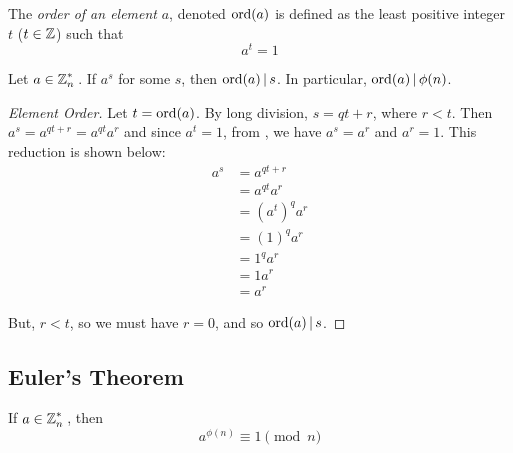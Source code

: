 \begin{definition}\label{def:Element_Order}
  The \emph{order of an element} $a$, denoted $\operatorname{\text{ord}}(a)$ is defined as the least positive integer $t$ ($t \in \operatorname{\mathbb{Z}}$) such that
  \begin{equation}\label{eq:Element_Order}
    a^{t} = 1
  \end{equation}
\end{definition}

\begin{lemma}\label{lemma:Element_Order}
  Let $a \in \operatorname{\mathbb{Z}}_{n}^{*}{}$.
  If $a^{s}$ for some $s$, then $\operatorname{\text{ord}}(a) \operatorname{\vert} s$.
  In particular, $\operatorname{\text{ord}}(a) \operatorname{\vert} \phi(n)$.
\end{lemma}

\begin{proof}[Element Order]\label{proof:Element_Order}
  Let $t = \operatorname{\text{ord}}(a)$.
  By long division, $s = qt + r$, where $r < t$.
  Then $a^{s} = a^{qt + r} = a^{qt}a^{r}$ and since $a^{t} = 1$, from , we have $a^{s} = a^{r}$ and $a^{r} = 1$.
  This reduction is shown below:
  \begin{align*}
    a^{s} &= a^{qt + r} \\
          &= a^{qt}a^{r} \\
          &= {\left( a^{t} \right)}^{q} a^{r} \\
          &= {\left( 1 \right)}^{q} a^{r} \\
          &= 1^{q} a^{r} \\
          &= 1 a^{r} \\
          &= a^{r}
  \end{align*}

  But, $r<t$, so we must have $r=0$, and so $\operatorname{\text{ord}}(a) \operatorname{\vert} s$.
\end{proof}

\subsection{Euler's Theorem}\label{subsec:Eulers_Theorem}
\begin{theorem}\label{thm:Eulers_Theorem}
  If $a \in \operatorname{\mathbb{Z}}_{n}^{*}{}$, then
  \begin{equation}\label{eq:Eulers_Theorem}
    a^{\phi(n)} \equiv 1 \pmod{n}
  \end{equation}
\end{theorem}

